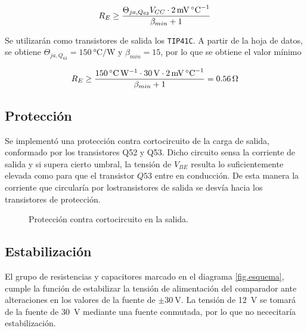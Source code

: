 \begin{equation}
	\centering
	R_E \geq \frac{\Theta_{ja,Q_{63}} V_{CC} \cdot \SI{2}{\milli\volt\per\celsius}}{\beta_{min} + 1}
	\label{ec.re}
\end{equation}
	
	Se utilizarán como transistores de salida los \texttt{TIP41C}. A partir de la hoja de datos, se obtiene $\Theta_{ja,Q_{63}} = \SI{150}{\celsius\per\watt}$ y $\beta_{min} = 15$, por lo que se obtiene el valor mínimo

	\begin{equation}
		\centering
		R_E \geq \frac{ \SI{150}{\celsius\per\watt} \cdot \SI{30}{\volt} \cdot \SI{2}{\milli\volt\per\celsius} }{ \beta_{min} + 1 } = \SI{0.56}{\ohm}
	\end{equation}

	\subsection{Protección}
	Se implementó una protección contra cortocircuito de la carga de salida, conformado por los transistores Q52 y Q53. Dicho circuito sensa la corriente de salida y si supera cierto umbral, la tensión de $V_{BE}$ resulta lo suficientemente elevada como para que el transistor $Q53$ entre en conducción. De esta manera la corriente que circularía por lostransistores de salida se desvía hacia los transistores de protección.

	\begin{figure}[H]
		\centering
		\scalebox{0.5}{}
		\caption{Protección contra cortocircuito en la salida.}
		\label{fig.proteccion}
	\end{figure}

	\subsection{Estabilización}

	El grupo de resistencias y capacitores marcado en el diagrama \ref{fig.esquema}, cumple la función de estabilizar la tensión de alimentación del comparador ante alteraciones en los valores de la fuente de $\pm \SI{30}{\volt}$. La tensión de \SI{12}{\volt} se tomará de la fuente de \SI{30}{\volt} mediante una fuente conmutada, por lo que no nececitaría estabilización.

